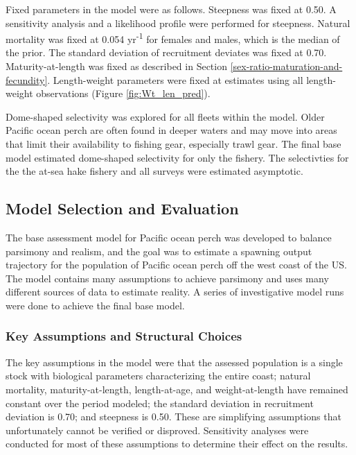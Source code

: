 \documentclass[12pt,]{article}
\begin{document}
Fixed parameters in the model were as follows. Steepness was fixed at
0.50. A sensitivity analysis and a likelihood profile were performed for
steepness. Natural mortality was fixed at 0.054 yr\textsuperscript{-1}
for females and males, which is the median of the prior. The standard
deviation of recruitment deviates was fixed at 0.70. Maturity-at-length
was fixed as described in Section
\ref{sex-ratio-maturation-and-fecundity}. Length-weight parameters were
fixed at estimates using all length-weight observations (Figure
\ref{fig:Wt_len_pred}).

Dome-shaped selectivity was explored for all fleets within the model.
Older Pacific ocean perch are often found in deeper waters and may move
into areas that limit their availability to fishing gear, especially
trawl gear. The final base model estimated dome-shaped selectivity for
only the fishery. The selectivties for the the at-sea hake fishery and
all surveys were estimated asymptotic.

\subsection{Model Selection and
Evaluation}\label{model-selection-and-evaluation}

The base assessment model for Pacific ocean perch was developed to
balance parsimony and realism, and the goal was to estimate a spawning
output trajectory for the population of Pacific ocean perch off the west
coast of the US. The model contains many assumptions to achieve
parsimony and uses many different sources of data to estimate reality. A
series of investigative model runs were done to achieve the final base
model.

\subsubsection{Key Assumptions and Structural
Choices}\label{key-assumptions-and-structural-choices}

The key assumptions in the model were that the assessed population is a
single stock with biological parameters characterizing the entire coast;
natural mortality, maturity-at-length, length-at-age, and
weight-at-length have remained constant over the period modeled; the
standard deviation in recruitment deviation is 0.70; and steepness is
0.50. These are simplifying assumptions that unfortunately cannot be
verified or disproved. Sensitivity analyses were conducted for most of
these assumptions to determine their effect on the results.
\end{document}
